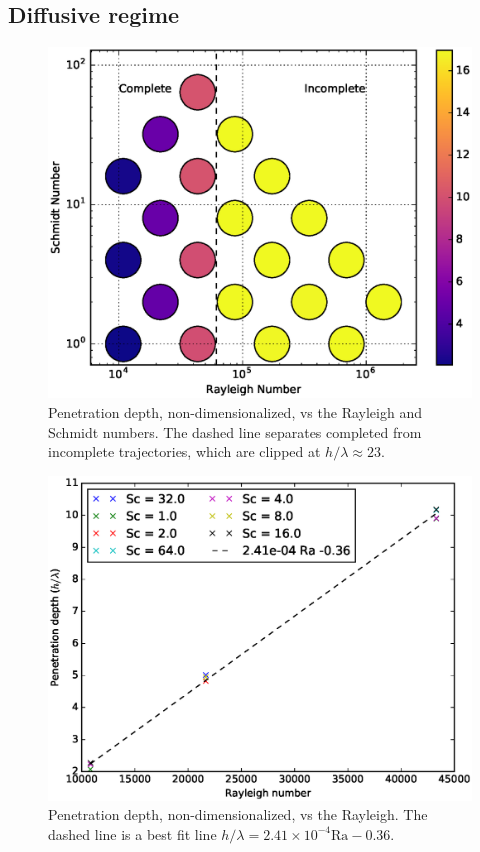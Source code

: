 \subsection{Diffusive regime}
\begin{figure}
\includegraphics[width=\columnwidth]{figs/PenetrationDepth-vs-Rayleigh-Schmidt}
\caption{ 
  Penetration depth, non-dimensionalized, vs the Rayleigh and Schmidt numbers.
  The dashed line separates completed from incomplete trajectories, which are clipped at $h/\lambda \approx 23$.
}
\end{figure}

\begin{figure}
\includegraphics[width=\columnwidth]{figs/Depth-vs-Rayleigh}
\caption{ 
  Penetration depth, non-dimensionalized, vs the Rayleigh.
  The dashed line is a best fit line $h/\lambda = 2.41 \times 10^{-4} \text{Ra} - 0.36$.
}
\end{figure}

